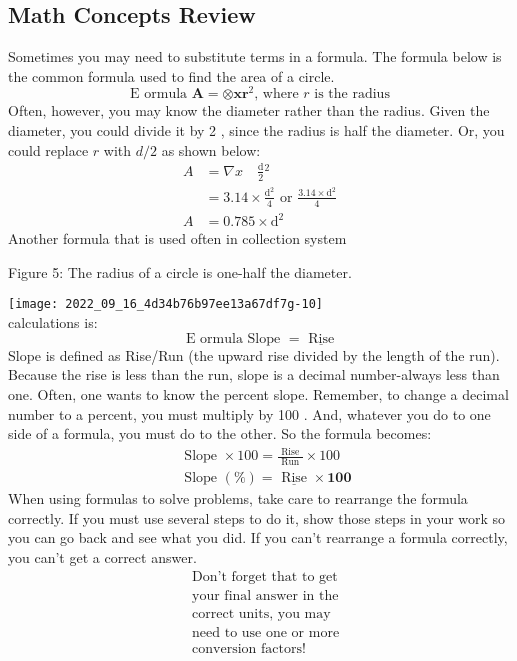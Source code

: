 \begin{enumerate}
\section{Math Concepts Review}
Sometimes you may need to substitute terms in a formula. The formula below is the common formula used to find the area of a circle.
$$
\text { E ormula } \mathbf{A}=\otimes \mathbf{x} \mathbf{r}^{2} \text {, where } r \text { is the radius }
$$
Often, however, you may know the diameter rather than the radius. Given the diameter, you could divide it by 2 , since the radius is half the diameter. Or, you could replace $r$ with $d / 2$ as shown below:
$$
\begin{aligned}
A &=\nabla x \quad \frac{\mathrm{d}}{2}{ }^{2} \\
&=3.14 \times \frac{\mathrm{d}^{2}}{4} \text { or } \frac{3.14 \times \mathrm{d}^{2}}{4} \\
A &=0.785 \times \mathrm{d}^{2}
\end{aligned}
$$
Another formula that is used often in collection system

Figure 5: The radius of a circle is one-half the diameter.

\texttt{[image: 2022\_09\_16\_4d34b76b97ee13a67df7g-10]}\\
calculations is:
$$
\text { E ormula Slope }=\underline{\text { Rise }}
$$
Slope is defined as Rise/Run (the upward rise divided by the length of the run). Because the rise is less than the run, slope is a decimal number-always less than one. Often, one wants to know the percent slope. Remember, to change a decimal number to a percent, you must multiply by 100 . And, whatever you do to one side of a formula, you must do to the other. So the formula becomes:
$$
\begin{aligned}
&\text { Slope } \times 100=\frac{\text { Rise }}{\text { Run }} \times 100 \\
&\text { Slope }(\%)=\underline{\text { Rise }} \times \mathbf{1 0 0}
\end{aligned}
$$
When using formulas to solve problems, take care to rearrange the formula correctly. If you must use several steps to do it, show those steps in your work so you can go back and see what you did. If you can't rearrange a formula correctly, you can't get a correct answer.
$$
\begin{aligned}
&\text { Don't forget that to get } \\
&\text { your final answer in the } \\
&\text { correct units, you may } \\
&\text { need to use one or more } \\
&\text { conversion factors! }
\end{aligned}
$$


\end{enumerate}
